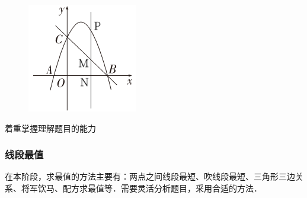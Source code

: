 \begin{figure}
    \vspace{-1cm}
    \includegraphics[width=1\linewidth]{figure/g2.png}
    \caption{}
    \label{fig:g2}
\end{figure}

\begin{remark}
着重掌握理解题目的能力
\end{remark}

\subsubsection*{线段最值}

在本阶段，求最值的方法主要有：两点之间线段最短、吹线段最短、三角形三边关系、将军饮马、配方求最值等．需要灵活分析题目，采用合适的方法．

